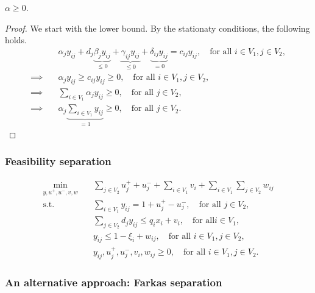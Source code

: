 \begin{proposition}
    $\alpha \ge 0$.
\end{proposition}
\begin{proof}
    We start with the lower bound. By the stationaty conditions, the following
    holds.
    \begin{align*}
        & \alpha_j y_{ij} + d_j \underbrace{\beta_j y_{ij}}_{\le 0} + \underbrace{\gamma_{ij} y_{ij}}_{\le 0} + \underbrace{\delta_{ij} y_{ij}}_{= 0} 
        = c_{ij} y_{ij}, \quad \text{for all } i\in V_1, j\in V_2,  \\
        \implies\quad & \alpha_j y_{ij} \ge c_{ij} y_{ij} \ge 0, \quad \text{for all } i\in V_1, j\in V_2, \\
        \implies\quad & \sum_{i\in V_1} \alpha_j y_{ij} \ge 0, \quad\text{for all } j\in V_2, \\
        \implies\quad & \alpha_j \underbrace{\sum_{i\in V_1} y_{ij}}_{=1} \ge 0, \quad \text{for all } j\in V_2.
    \end{align*}
\end{proof}

\subsubsection{Feasibility separation}

\begin{subequations}
    \begin{align*}
        \min_{y,u^+, u^-, v, w} \quad & \sum_{j\in V_2} u_j^+ + u_j^- + \sum_{i\in V_1} v_i + \sum_{i\in V_1}\sum_{j\in V_2} w_{ij} \\
        \text{s.t.} \quad & \sum_{i\in V_1} y_{ij} = 1 + u^+_j - u^-_j, \quad \text{for all } j\in V_2, \\
        & \sum_{j\in V_2} d_jy_{ij} \le q_i x_i + v_i, \quad \text{for all} i\in V_1, \\
        & y_{ij} \le 1 - \xi_i + w_{ij}, \quad \text{for all } i\in V_1, j\in V_2, \\
        & y_{ij}, u_j^+, u_j^-, v_i, w_{ij} \ge 0, \quad \text{for all } i\in V_1, j\in V_2.
    \end{align*}
\end{subequations}

\subsubsection{An alternative approach: Farkas separation}


